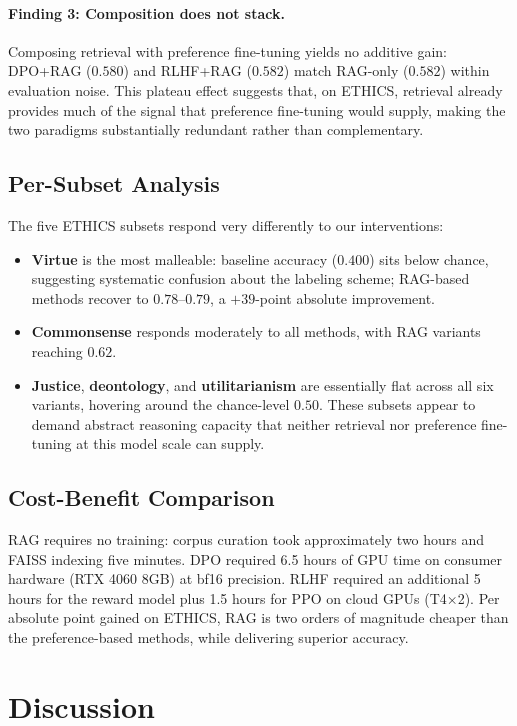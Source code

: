 \paragraph{Finding 3: Composition does not stack.}
Composing retrieval with preference fine-tuning yields no additive gain: DPO+RAG ($0.580$) and RLHF+RAG ($0.582$) match RAG-only ($0.582$) within evaluation noise. This plateau effect suggests that, on ETHICS, retrieval already provides much of the signal that preference fine-tuning would supply, making the two paradigms substantially redundant rather than complementary.

\subsection{Per-Subset Analysis}
The five ETHICS subsets respond very differently to our interventions:
\begin{itemize}
    \item \textbf{Virtue} is the most malleable: baseline accuracy ($0.400$) sits below chance, suggesting systematic confusion about the labeling scheme; RAG-based methods recover to $0.78$--$0.79$, a $+39$-point absolute improvement.
    \item \textbf{Commonsense} responds moderately to all methods, with RAG variants reaching $0.62$.
    \item \textbf{Justice}, \textbf{deontology}, and \textbf{utilitarianism} are essentially flat across all six variants, hovering around the chance-level $0.50$. These subsets appear to demand abstract reasoning capacity that neither retrieval nor preference fine-tuning at this model scale can supply.
\end{itemize}

\subsection{Cost-Benefit Comparison}
RAG requires no training: corpus curation took approximately two hours and FAISS indexing five minutes. DPO required 6.5 hours of GPU time on consumer hardware (RTX 4060 8GB) at bf16 precision. RLHF required an additional 5 hours for the reward model plus 1.5 hours for PPO on cloud GPUs (T4×2). Per absolute point gained on ETHICS, RAG is two orders of magnitude cheaper than the preference-based methods, while delivering superior accuracy.

\section{Discussion}

